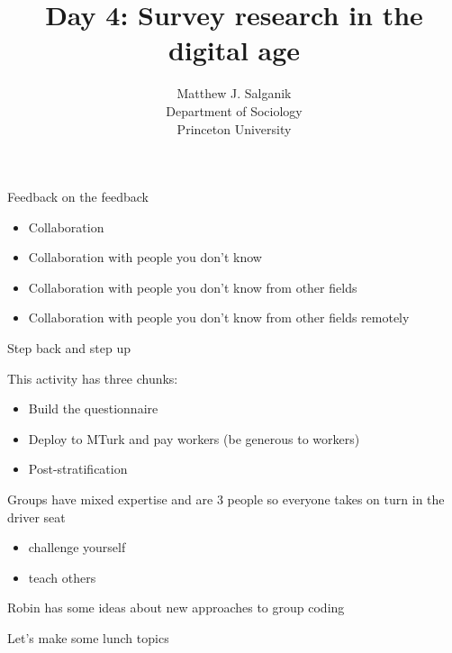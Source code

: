 \documentclass[aspectratio=169]{beamer}
\title[]{Day 4: Survey research in the digital age}
\author[]{Matthew J. Salganik\\Department of Sociology\\Princeton University}
\date[]{%
\begin{flushright}
\vfill
\texttt{[image: figures/cc-by.png]}
\end{flushright}
}
\begin{document}
\frame{\titlepage}
\begin{frame}

\begin{center}
\Large{Feedback on the feedback}
\end{center}

\end{frame}
\begin{frame}

\begin{itemize}
\item Collaboration \pause
\item Collaboration with people you don't know \pause
\item Collaboration with people you don't know from other fields \pause
\item Collaboration with people you don't know from other fields remotely \pause
\end{itemize}

\vfill
Step back and step up

\end{frame}
\begin{frame}

This activity has three chunks:
\begin{itemize}
\item Build the questionnaire \pause
\item Deploy to MTurk and pay workers (be generous to workers) \pause
\item Post-stratification \pause
\end{itemize}

Groups have mixed expertise and are 3 people so everyone takes on turn in the driver seat
\begin{itemize}
\item challenge yourself
\item teach others
\end{itemize}

\end{frame}
\begin{frame}

\begin{center}
\Large{Robin has some ideas about new approaches to group coding}
\end{center}

\end{frame}
\begin{frame}

\begin{center}
\Large{Let's make some lunch topics}
\end{center}

\end{frame}
\end{document}
